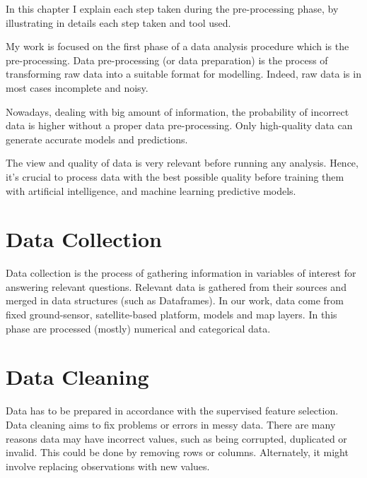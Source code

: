 In this chapter I explain each step taken during the pre-processing phase, by illustrating in details each step taken and tool used. \newline
\par
My work is focused on the first phase of a data analysis procedure which is the pre-processing.
Data pre-processing (or data preparation) is the process of transforming raw data into a suitable format for modelling. 
Indeed, raw data is in most cases incomplete and noisy.\par
Nowadays, dealing with big amount of information, the probability of incorrect data is higher without a proper data pre-processing.
Only high-quality data can generate accurate models and predictions. \par
The view and quality of data is very relevant before running any analysis.
Hence, it’s crucial to process data with the best possible quality before training them with artificial intelligence, and machine learning predictive models.\par
\section{Data Collection}
Data collection is the process of gathering information in variables of interest for answering relevant questions. \newline
Relevant data is gathered from their sources and merged in data structures (such as Dataframes). In our work, data come from fixed ground-sensor, satellite-based platform, models and map layers. In this phase are processed (mostly) numerical and categorical data. 
\section{Data Cleaning}
\label{sec:Data cleaning}
Data has to be prepared in accordance with the supervised feature selection.
Data cleaning aims to fix problems or errors in messy data. There are many reasons data may have incorrect values, such as being corrupted, duplicated or invalid. \newline
This could be done by removing rows or columns. Alternately, it might involve replacing observations with new values. \newline

